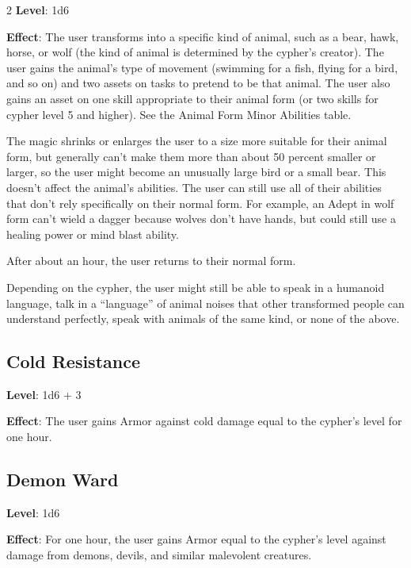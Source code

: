 \begin{multicols}{2}
\textbf{Level}: 1d6 

\textbf{Effect}: The user transforms into a specific kind of animal, such as a bear, hawk, horse, or wolf (the kind of animal is determined by the cypher’s creator). The user gains the animal’s type of movement (swimming for a fish, flying for a bird, and so on) and two assets on tasks to pretend to be that animal. The user also gains an asset on one skill appropriate to their animal form (or two skills for cypher level 5 and higher). See the Animal Form Minor Abilities table. 

The magic shrinks or enlarges the user to a size more suitable for their animal form, but generally can’t make them more than about 50 percent smaller or larger, so the user might become an unusually large bird or a small bear. This doesn’t affect the animal’s abilities. The user can still use all of their abilities that don’t rely specifically on their normal form. For example, an Adept in wolf form can’t wield a dagger because wolves don’t have hands, but could still use a healing power or mind blast ability. 

After about an hour, the user returns to their normal form.

Depending on the cypher, the user might still be able to speak in a humanoid language, talk in a “language” of animal noises that other transformed people can understand perfectly, speak with animals of the same kind, or none of the above.

\subsection{Cold Resistance}

\textbf{Level}: 1d6 + 3 

\textbf{Effect}: The user gains Armor against cold damage equal to the cypher’s level for one hour. 

\subsection{Demon Ward}

\textbf{Level}: 1d6 

\textbf{Effect}: For one hour, the user gains Armor equal to the cypher’s level against damage from demons, devils, and similar malevolent creatures.


\end{multicols}
